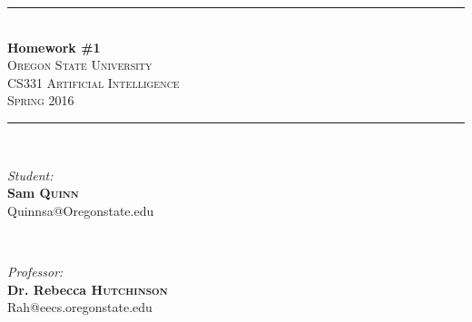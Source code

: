 \documentclass[letterpaper,11pt,notitlepage,fleqn]{article}
\begin{document}
\begin{titlepage}
\vspace*{\fill}

\newcommand{\HRule}{\rule{\linewidth}{0.5mm}} %

\center %


\HRule \\[0.4cm]
{ \huge \bfseries Homework \#1}\\[0.4cm] %


\textsc{\LARGE Oregon State University}\\[0.5cm] %
\textsc{\Large CS331 Artificial Intelligence}\\[0.5cm] %
\textsc{\large Spring 2016}\\[0.5cm] %


\HRule \\[1.5cm]

\begin{minipage}{0.4\textwidth}
\begin{flushleft} \large
\emph{Student:}\\
        \noindent \textbf{Sam \textsc{Quinn}} \\ %
        {\small Quinnsa@Oregonstate.edu}
        \end{flushleft}
        \end{minipage}
        ~
        \begin{minipage}{0.4\textwidth}
        \begin{flushright} \large
        \emph{Professor:} \\
            \noindent \textbf{Dr. Rebecca \textsc{Hutchinson}} \\ %
            {\small Rah@eecs.oregonstate.edu}
            \end{flushright}
            \end{minipage}\\[3cm]


\end{titlepage}
\end{document}
